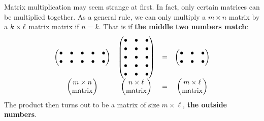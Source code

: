 \documentclass{ximera}
\begin{document}
Matrix multiplication may seem strange at first. In fact, only certain
matrices can be multiplied together. As a general rule, we can only
multiply a $m \times n$ matrix by a $k \times \ell$ matrix matrix if
$n=k$. That is if \textbf{the middle two numbers match}:
\[
\begin{matrix}
\begin{pmatrix}
    \bullet & \bullet & \bullet & \bullet & \bullet\\
    \bullet & \bullet & \bullet & \bullet & \bullet\\
\end{pmatrix}
&
\begin{pmatrix}
    \bullet & \bullet &\bullet \\\bullet & \bullet & \bullet \\  \bullet & \bullet & \bullet \\\bullet & \bullet & \bullet \\ \bullet & \bullet & \bullet \end{pmatrix} &= &
\begin{pmatrix}
  \bullet & \bullet &\bullet \\\bullet & \bullet &  \bullet
\end{pmatrix}\\
\begin{pmatrix}
  m\times n\\
  \text{matrix}
\end{pmatrix} &
\begin{pmatrix}
  n\times \ell\\
  \text{matrix}
\end{pmatrix}
&= & \begin{pmatrix}
  m\times \ell\\
  \text{matrix}
\end{pmatrix}
\end{matrix}
\]
The product then turns out to be a matrix of size $m\times \ell$, \textbf{the
outside numbers}.
\end{document}

